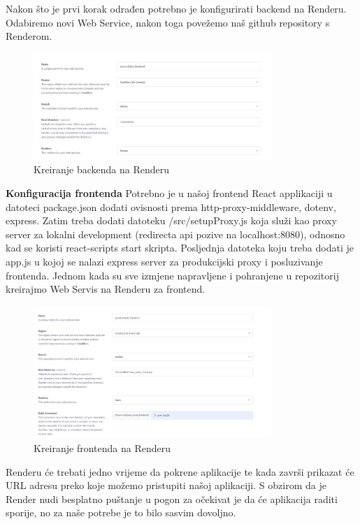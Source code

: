 		Nakon što je prvi korak odrađen potrebno je konfigurirati backend na Renderu. Odabiremo novi Web Service, nakon toga povežemo naš github repository s Renderom. 
		
		\begin{figure}[h]
			\centering
			\includegraphics[width=0.8\textwidth]{slike/pustanju_u_pogon_4.jpg}
			\caption{Kreiranje backenda na Renderu}
			\label{fig:backend_render}
		\end{figure}
		
		\textbf{Konfiguracija frontenda}
		Potrebno je u našoj frontend React applikaciji u datoteci package.json dodati ovisnosti prema http-proxy-middleware, dotenv, express. Zatim treba dodati datoteku /src/setupProxy.js koja služi kao proxy server za lokalni development (redirecta api pozive na localhost:8080), odnosno kad se koristi react-scripts start skripta. Posljednja datoteka koju treba dodati je app.js u kojoj se nalazi express server za produkcijski proxy i posluzivanje frontenda. Jednom kada su sve izmjene napravljene i pohranjene u repozitorij kreirajmo Web Servis na Renderu za frontend. 
			
		\begin{figure}[h]
			\centering
			\includegraphics[width=0.8\textwidth]{slike/pustanju_u_pogon_5.jpg}
			\caption{Kreiranje frontenda na Renderu}
			\label{fig:frontend_render}
		\end{figure}
		
		Renderu će trebati jedno vrijeme da pokrene aplikacije te kada završi prikazat će URL adresu preko koje možemo pristupiti našoj aplikaciji. S obzirom da je Render nudi besplatno puštanje u pogon za očekivat je da će aplikacija raditi sporije, no za naše potrebe je to bilo sasvim dovoljno.